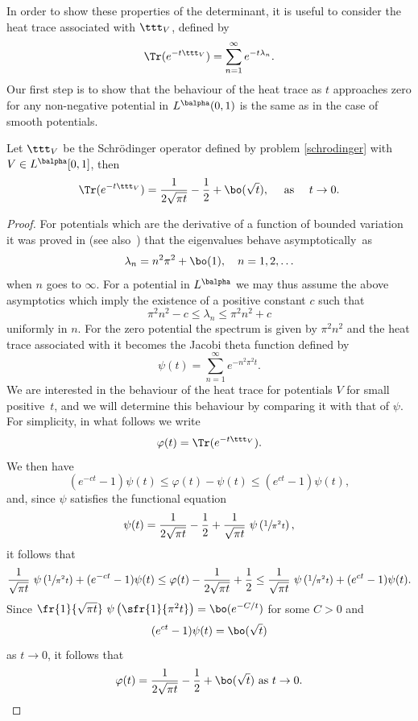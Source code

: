 In order to show these properties of the determinant, it is useful to consider the heat trace associated with $\ttt_V$, defined by\vspace*{-3pt}\enlargethispage{\baselineskip}%
\[
\Tr(e^{-t \ttt_V}) = \sum_{n=1}^{\infty} e^{-t \lambda_n}.
\]
Our first step is to show that the behaviour of the heat trace as $t$ approaches zero for any non-negative potential in $L^{\balpha}(0,1)$ is
the same as in the case of smooth potentials.
\begin{prop}\label{heattrace}
Let $\ttt_V$ be the Schrödinger operator defined by problem
\eqref{schrodinger} with $V\in L^{\balpha}[0,1]$, then\vspace*{-3pt}
\[
\Tr(e^{-t \ttt_V}) = \frac{1}{2\sqrt{\pi t}} - \frac{1}{2} + \bo(\sqrt{t}), \quad \textrm{ as } \quad t\to 0.
\]
\label{detSchL1}
\end{prop}
\begin{proof}
For potentials which are the derivative of a function of bounded variation it was proved in \cite[\S3]{SavcShka99}
(see also~\cite[Th.\,1]{Savchuk}) that the eigenvalues behave asymptotically~as\vspace*{-3pt}
\begin{equation}
\lambda_n = n^2\pi^2 + \bo(1), \quad n=1,2,\dots \label{eq:evas}
\end{equation}
when $n$ goes to $\infty$. For a potential in $L^{\balpha}$ we may thus assume the above asymptotics which imply
the existence of a positive constant $c$ such that
\[
\pi^2 n^2 - c \leq \lambda_n \leq \pi^2 n^2 + c
\]
uniformly in $n$.
For the zero potential the spectrum is given by $\pi^2 n^2$ and the heat trace associated with it becomes the Jacobi theta function defined by
\[
\psi(t) = \sum_{n=1}^{\infty} e^{-n^2 \pi^2 t}.
\]
We are interested in the behaviour of the heat trace for potentials $V$ for small positive~$t$, and we will determine this
behaviour by comparing it with that of $\psi$. For simplicity, in what follows we write
\[
\varphi(t) = \Tr(e^{-t \ttt_V}).
\]
We then have
\[
\left(e^{-c t}-1\right) \psi(t) \leq \varphi(t) - \psi(t) \leq \left(e^{c t}-1\right) \psi(t),
\]
and, since $\psi$ satisfies the functional equation~\cite[p.\,22]{titc}
\[
\psi(t)=\frac{1}{2\sqrt{\pi t}} - \frac{1}{2} + \frac{1}{\sqrt{\pi t}} \ \psi\left(\sfrac{1}{\pi^2 t}\right),
\]
it follows that
\[
\frac{1}{\sqrt{\pi t}} \ \psi\left(\sfrac{1}{\pi^2 t}\right) + (e^{-c t}-1)\psi(t) \leq \varphi(t) - \frac{1}{2\sqrt{\pi t}} + \frac{1}{2}
\leq \frac{1}{\sqrt{\pi t}} \ \psi\left(\sfrac{1}{\pi^2 t}\right) + (e^{c t}-1) \psi(t).
\]
Since $\fr{1}{\sqrt{\pi t}} \ \psi\left(\sfr{1}{\pi^2 t}\right) = \bo(e^{-C/t})$ for some $C>0$ and
\[
(e^{c t}-1) \psi(t) = \bo(\sqrt{t})
\]
as $t\to 0$, it follows that
\[
\varphi(t) = \frac{1}{2\sqrt{\pi t}} - \frac{1}{2} + \bo(\sqrt{t}) \mbox{ as } t\to 0.\qedhere
\]\end{proof}

